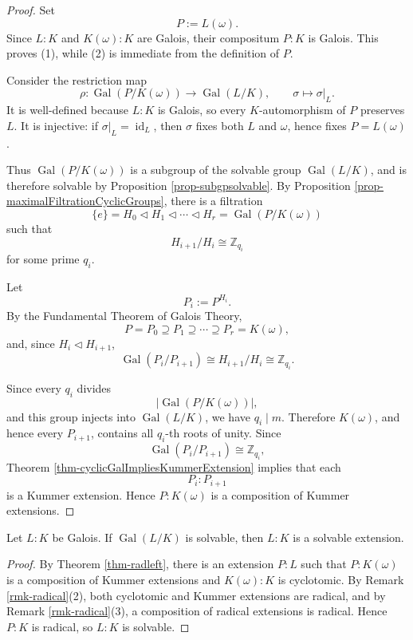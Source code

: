 \begin{proof}
    Set
    \[
    P:=L(\omega).
    \]
    Since $L:K$ and $K(\omega):K$ are Galois, their compositum $P:K$ is Galois. This proves (1), while (2) is immediate from the definition of $P$.

    Consider the restriction map
    \[
    \rho:\operatorname{Gal}(P/K(\omega))
    \longrightarrow \operatorname{Gal}(L/K),
    \qquad
    \sigma\longmapsto \sigma|_L.
    \]
    It is well-defined because $L:K$ is Galois, so every $K$-automorphism of $P$ preserves $L$. It is injective: if $\sigma|_L=\operatorname{id}_L$, then $\sigma$ fixes both $L$ and $\omega$, hence fixes $P=L(\omega)$.

    Thus $\operatorname{Gal}(P/K(\omega))$ is a subgroup of the solvable group $\operatorname{Gal}(L/K)$, and is therefore solvable by Proposition \ref{prop-subgpsolvable}. By Proposition \ref{prop-maximalFiltrationCyclicGroups}, there is a filtration
    \[
    \{e\}=H_0\lhd H_1\lhd\cdots\lhd H_r
    =\operatorname{Gal}(P/K(\omega))
    \]
    such that
    \[
    H_{i+1}/H_i\cong\mathbb Z_{q_i}
    \]
    for some prime $q_i$.

    Let
    \[
    P_i:=P^{H_i}.
    \]
    By the Fundamental Theorem of Galois Theory,
    \[
    P=P_0\supseteq P_1\supseteq\cdots\supseteq P_r=K(\omega),
    \]
    and, since $H_i\lhd H_{i+1}$,
    \[
    \operatorname{Gal}(P_i/P_{i+1})
    \cong H_{i+1}/H_i
    \cong\mathbb Z_{q_i}.
    \]

    Since every $q_i$ divides
    \[
    |\operatorname{Gal}(P/K(\omega))|,
    \]
    and this group injects into $\operatorname{Gal}(L/K)$, we have $q_i\mid m$. Therefore $K(\omega)$, and hence every $P_{i+1}$, contains all $q_i$-th roots of unity. Since
    \[
    \operatorname{Gal}(P_i/P_{i+1})\cong\mathbb Z_{q_i},
    \]
    Theorem \ref{thm-cyclicGalImpliesKummerExtension} implies that each
    \[
    P_i:P_{i+1}
    \]
    is a Kummer extension. Hence $P:K(\omega)$ is a composition of Kummer extensions.
\end{proof}

\begin{corollary}
    Let $L:K$ be Galois. If $\operatorname{Gal}(L/K)$ is solvable, then $L:K$ is a solvable extension.
\end{corollary}

\begin{proof}
    By Theorem \ref{thm-radleft}, there is an extension $P:L$ such that
    $P:K(\omega)$ is a composition of Kummer extensions and $K(\omega):K$ is cyclotomic. By Remark \ref{rmk-radical}(2), both cyclotomic and Kummer extensions are radical, and by Remark \ref{rmk-radical}(3), a composition of radical extensions is radical. Hence $P:K$ is radical, so $L:K$ is solvable.
\end{proof}

